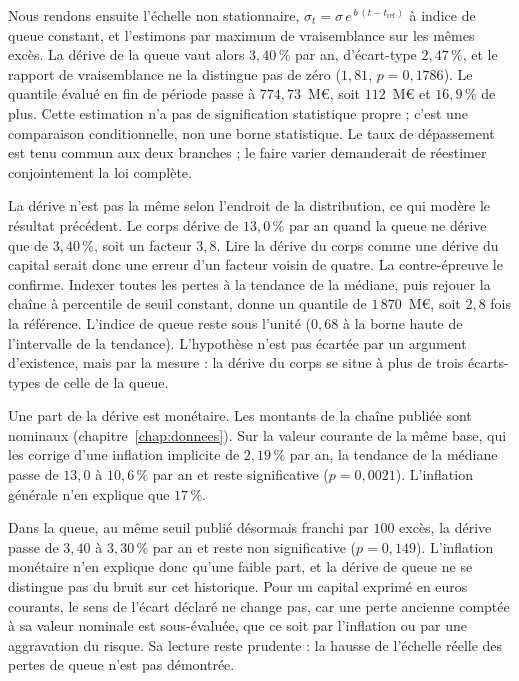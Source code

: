 Nous rendons ensuite l'échelle non stationnaire,
$\sigma_t = \sigma\,e^{\,b\,(t-t_{\mathrm{ref}})}$ à indice de queue constant, et l'estimons par maximum de
vraisemblance sur les mêmes excès. La dérive de la queue vaut alors $3{,}40\,\%$ par an, d'écart-type
$2{,}47\,\%$, et le rapport de vraisemblance ne la distingue pas de zéro ($1{,}81$, $p=0{,}1786$). Le quantile
évalué en fin de période passe à $774{,}73$~M\euro, soit $112$~M\euro{} et $16{,}9\,\%$ de plus. Cette estimation n'a pas
de signification statistique propre ; c'est une comparaison conditionnelle, non une borne statistique. Le taux de dépassement est tenu commun
aux deux branches ; le faire varier demanderait de réestimer conjointement la loi complète.

La dérive n'est pas la même selon l'endroit de la distribution, ce qui modère le résultat précédent. Le corps
dérive de $13{,}0\,\%$ par an quand la queue ne dérive que de $3{,}40\,\%$, soit un facteur $3{,}8$. Lire la
dérive du corps comme une dérive du capital serait donc une erreur d'un facteur voisin de quatre. La contre-épreuve
le confirme. Indexer toutes les pertes à la tendance de la médiane, puis rejouer la chaîne à
percentile de seuil constant, donne un quantile de $1\,870$~M\euro, soit $2{,}8$ fois la référence. L'indice
de queue reste sous l'unité ($0{,}68$ à la borne haute de l'intervalle de la tendance). L'hypothèse
n'est pas écartée par un argument d'existence, mais par la mesure : la dérive du corps se situe à plus de trois
écarts-types de celle de la queue.

Une part de la dérive est monétaire. Les montants de la chaîne publiée sont nominaux
(chapitre~\ref{chap:donnees}). Sur la valeur courante de la même base, qui les corrige d'une inflation
implicite de $2{,}19\,\%$ par an, la tendance de la médiane passe de $13{,}0$ à $10{,}6\,\%$ par an et reste
significative ($p=0{,}0021$). L'inflation générale n'en explique que $17\,\%$.

Dans la queue, au même seuil
publié désormais franchi par $100$ excès, la dérive passe de $3{,}40$ à $3{,}30\,\%$ par an et reste non
significative ($p=0{,}149$). L'inflation monétaire n'en explique donc qu'une faible part, et la dérive de queue ne
se distingue pas du bruit sur cet historique. Pour un capital exprimé en euros courants, le sens de l'écart
déclaré ne change pas, car une perte ancienne comptée à sa valeur nominale est sous-évaluée, que ce soit par
l'inflation ou par une aggravation du risque. Sa lecture reste prudente : la hausse de l'échelle réelle des
pertes de queue n'est pas démontrée.

